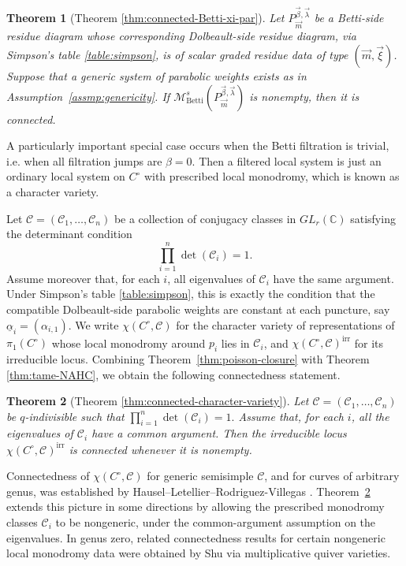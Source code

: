 \documentclass[11pt]{amsart}
\theoremstyle{plain}
\newtheorem{theorem}{Theorem}[section]
\theoremstyle{definition}
\theoremstyle{remark}
\newcommand{\C}{\mathbb C}
\def\C{\mathbb{C}}
\begin{document}
\begin{theorem}[Theorem \ref{thm:connected-Betti-xi-par}]\label{thm:intro-Betti-filtered-connected}
	Let $P^{\vec\beta,\vec\lambda}_{\vec m}$ be a Betti-side residue diagram whose
	corresponding Dolbeault-side residue diagram, via Simpson's table \ref{table:simpson}, is of scalar graded
	residue data of type $(\vec m,\vec\xi)$. Suppose that a generic system of parabolic weights exists as in Assumption~\ref{assmp:genericity}. If $\mathcal M^{s}_{\mathrm{Betti}}(P^{\vec\beta,\vec\lambda}_{\vec m})$
	is nonempty, then it is connected.
\end{theorem}

A particularly important special case occurs when the Betti filtration is
trivial, i.e. when all filtration jumps are $\beta=0$. Then a filtered local
system is just an ordinary local system on $C^\circ$ with prescribed local
monodromy, which is known as a character variety. 

Let $\mathcal C=(\mathcal C_1,\ldots,\mathcal C_n)$ be a collection of conjugacy
classes in $GL_r(\C)$ satisfying the determinant condition
\[
\prod_{i=1}^n\det(\mathcal C_i)=1.
\]
Assume moreover that, for each $i$, all eigenvalues of $\mathcal C_i$ have the
same argument. Under Simpson's table \ref{table:simpson}, this is exactly the condition that the
compatible Dolbeault-side parabolic weights are constant at each puncture, say
$\underline{\alpha}_i=(\alpha_{i,1})$. We write $\chi(C^\circ,\mathcal C)$ for the
character variety of representations of $\pi_1(C^\circ)$ whose local monodromy
around $p_i$ lies in $\mathcal C_i$, and $\chi(C^\circ,\mathcal C)^{\mathrm{irr}}$
for its irreducible locus. Combining Theorem~\ref{thm:poisson-closure} with Theorem \ref{thm:tame-NAHC}, we obtain the following connectedness statement.

\begin{theorem}[Theorem \ref{thm:connected-character-variety}]\label{thm:intro-character-connected}
Let $\mathcal C=(\mathcal C_1,\ldots,\mathcal C_n)$ be $q$-indivisible such that $\prod_{i=1}^n\det(\mathcal C_i)=1.$ Assume that, for each $i$, all the eigenvalues of $\mathcal C_i$ have a common argument. Then the irreducible locus
	$\chi(C^\circ,\mathcal C)^{\operatorname{irr}}$
	is connected whenever it is nonempty. 
\end{theorem}

Connectedness of $\chi(C^\circ,\mathcal C)$ for generic semisimple
$\mathcal C$, and for curves of arbitrary genus, was established by
Hausel--Letellier--Rodriguez-Villegas \cite{HauselRodriguez2013}.
Theorem~\ref{thm:intro-character-connected} extends this picture in some
directions by allowing the prescribed monodromy classes $\mathcal C_i$ to be
nongeneric, under the common-argument assumption on the eigenvalues. In genus
zero, related connectedness results for certain nongeneric local monodromy data
were obtained by Shu \cite{Shu2025DSP} via multiplicative quiver varieties.
\end{document}
